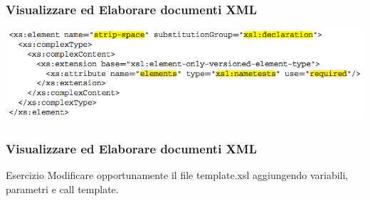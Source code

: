 \begin{frame}
    \frametitle{Visualizzare ed Elaborare documenti XML}
    \addtocounter{nframe}{1}
    
    \begin{center}
        \includegraphics[width=.9\textwidth]{imgs/Schema-strip-space.png}
    \end{center}

\end{frame}

\begin{frame}
    \frametitle{Visualizzare ed Elaborare documenti XML}
    \addtocounter{nframe}{1}
    
    \begin{block}{Esercizio}
        Modificare opportunamente il file template.xsl aggiungendo variabili, parametri e call template.
    \end{block}

\end{frame}


